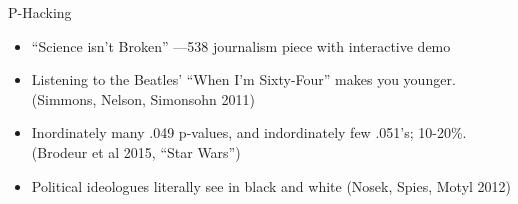\documentclass{beamer}
\begin{document}
{ \begin{frame}[plain]
     \end{frame}
}

\begin{frame}{P-Hacking}
\begin{itemize}
\item
``Science isn't Broken'' ---538 journalism piece with interactive demo \href{http://fivethirtyeight.com/features/science-isnt-broken}{}
\item
Listening to the Beatles' ``When I'm Sixty-Four'' makes you younger. (Simmons, Nelson, Simonsohn 2011)
\item
Inordinately many .049 p-values, and indordinately few .051's; 10-20\%. (Brodeur et al 2015, ``Star Wars'')
\item 
Political ideologues literally see in black and white (Nosek, Spies, Motyl 2012)
\end{itemize}

\end{frame}

\end{document}
